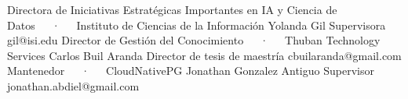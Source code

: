 \begin{cventries}
   \cventry
   {Directora de Iniciativas Estratégicas Importantes en IA y Ciencia de Datos~~~·~~~Instituto de Ciencias de la Información} %
   {Yolanda Gil} %
   {Supervisora} %
   {gil@isi.edu} %
   {} %
   \cventry
   {Director de Gestión del Conocimiento~~~·~~~Thuban Technology Services} %
   {Carlos Buil Aranda} %
   {Director de tesis de maestría} %
   {cbuilaranda@gmail.com} %
   {} %
   \cventry
   {Mantenedor~~~·~~~CloudNativePG} %
   {Jonathan Gonzalez} %
   {Antiguo Supervisor} %
   {jonathan.abdiel@gmail.com} %
   {} %
\end{cventries}